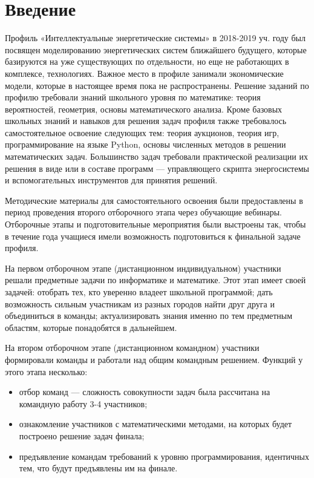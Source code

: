%
\begingroup
\pagestyle{empty}

\section*{Введение}

Профиль «Интеллектуальные энергетические системы» в 2018-2019 уч. году был посвящен моделированию энергетических систем ближайшего будущего, которые базируются на уже существующих по отдельности, но еще не работающих в комплексе, технологиях. Важное место в профиле занимали экономические модели, которые в настоящее время пока не распространены. Решение заданий по профилю требовали знаний школьного уровня по математике: теория вероятностей, геометрия, основы математического анализа. Кроме базовых школьных знаний и навыков для решения задач профиля также требовалось самостоятельное освоение следующих тем: теория аукционов, теория игр, программирование на языке Python, основы численных методов в решении математических задач. Большинство задач требовали практической реализации их решения в виде или в составе программ — управляющего скрипта энергосистемы и вспомогательных инструментов для принятия решений.

Методические материалы для самостоятельного освоения были предоставлены в период проведения второго отборочного этапа через обучающие вебинары. Отборочные этапы и подготовительные мероприятия были выстроены так, чтобы в течение года учащиеся имели возможность подготовиться к финальной задаче профиля.

На первом отборочном этапе (дистанционном индивидуальном) участники решали предметные задачи по информатике и математике. Этот этап имеет своей задачей: отобрать тех, кто уверенно владеет школьной программой; дать возможность сильным участникам из разных городов найти друг друга и объединиться в команды; актуализировать знания именно по тем предметным областям, которые понадобятся в дальнейшем.

На втором отборочном этапе (дистанционном командном) участники формировали команды и работали над общим командным решением. Функций у этого этапа несколько: 
\begin{itemize}
\item отбор команд — сложность совокупности задач была рассчитана на  командную работу 3-4 участников; 
\item ознакомление участников с математическими методами, на которых будет построено решение задач финала; 
\item предъявление командам требований к уровню программирования, идентичных тем, что будут предъявлены им на финале.
\end{itemize}

